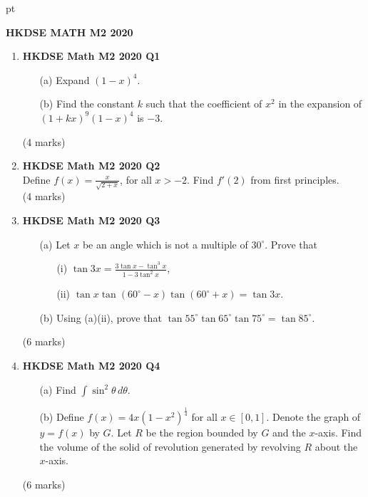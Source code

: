 \documentclass[12pt]{article}
\begin{document}
 pt
\begin{center}
	{\large \bf HKDSE MATH M2 2020}\\
	\vspace{2 mm}

\end{center}
\vspace{0.05cm}

\begin{enumerate}
	\item \textbf{HKDSE Math M2 2020 Q1}
	\begin{enumerate}
		\item [(a)] Expand $(1-x)^4$.
		\item [(b)] Find the constant $k$ such that the coefficient of $x^2$ in the expansion of $(1+kx)^9(1-x)^4$ is $-3$.
	\end{enumerate}
	(4 marks)

	\item \textbf{HKDSE Math M2 2020 Q2}\\
	Define $\displaystyle f(x) = \frac{x}{\sqrt{2+x}}$, for all $x > -2$. Find $f'(2)$ from first principles. \\(4 marks)


	\item \textbf{HKDSE Math M2 2020 Q3}
	\begin{enumerate}
		\item [(a)] Let $x$ be an angle which is not a multiple of $30^\circ$. Prove that 
		\begin{enumerate}
			\item [(i)]$\tan{3x} = \displaystyle \frac{3\tan{x} - \tan^3{x}}{1-3\tan^2{x}}$, 
			\item [(ii)] $\tan{x} \tan(60^\circ - x)\tan(60^\circ + x) = \tan{3x}$. 
		\end{enumerate}
		\item [(b)] Using (a)(ii), prove that $\tan{55^\circ}\tan{65^\circ}\tan{75^\circ} = \tan{85^\circ}$.
	\end{enumerate}
	(6 marks)

	\item \textbf{HKDSE Math M2 2020 Q4}
	\begin{enumerate}
		\item [(a)]Find $\displaystyle \int \sin^2{\theta} \,d\theta$. 
		\item [(b)]Define $\displaystyle f(x) = 4x(1-x^2)^{\frac{1}{4}}$ for all $x \in [0,1]$. Denote the graph of $y = f(x) $ by $G$. Let $R$ be the region bounded by $G$ and the $x$-axis. Find the volume of the solid of revolution generated by revolving $R$ about the $x$-axis.
	\end{enumerate}
	(6 marks)


\end{enumerate}
\end{document}
